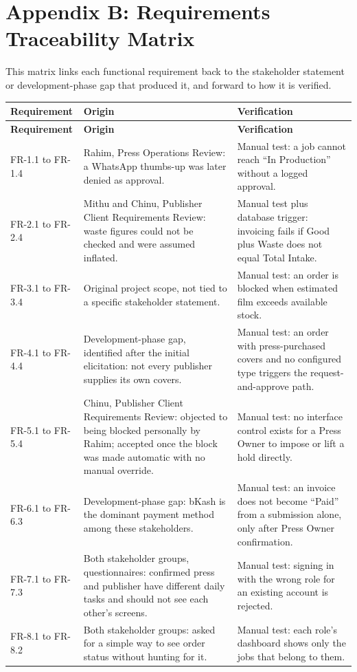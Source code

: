 \documentclass{scrreprt}
\begin{document}
\chapter*{Appendix B: Requirements Traceability Matrix}
This matrix links each functional requirement back to the stakeholder statement or development-phase gap that produced it, and forward to how it is verified.
\begin{longtable}{L{0.20\textwidth} L{0.45\textwidth} L{0.35\textwidth}}
\toprule
{} \textbf{Requirement} & \textbf{Origin} & \textbf{Verification} \\
\midrule
\endfirsthead
\toprule
{} \textbf{Requirement} & \textbf{Origin} & \textbf{Verification} \\
\midrule
\endhead
FR-1.1 to FR-1.4 & Rahim, Press Operations Review: a WhatsApp thumbs-up was later denied as approval. & Manual test: a job cannot reach ``In Production'' without a logged approval. \\
FR-2.1 to FR-2.4 & Mithu and Chinu, Publisher Client Requirements Review: waste figures could not be checked and were assumed inflated. & Manual test plus database trigger: invoicing fails if Good plus Waste does not equal Total Intake. \\
FR-3.1 to FR-3.4 & Original project scope, not tied to a specific stakeholder statement. & Manual test: an order is blocked when estimated film exceeds available stock. \\
FR-4.1 to FR-4.4 & Development-phase gap, identified after the initial elicitation: not every publisher supplies its own covers. & Manual test: an order with press-purchased covers and no configured type triggers the request-and-approve path. \\
FR-5.1 to FR-5.4 & Chinu, Publisher Client Requirements Review: objected to being blocked personally by Rahim; accepted once the block was made automatic with no manual override. & Manual test: no interface control exists for a Press Owner to impose or lift a hold directly. \\
FR-6.1 to FR-6.3 & Development-phase gap: bKash is the dominant payment method among these stakeholders. & Manual test: an invoice does not become ``Paid'' from a submission alone, only after Press Owner confirmation. \\
FR-7.1 to FR-7.3 & Both stakeholder groups, questionnaires: confirmed press and publisher have different daily tasks and should not see each other's screens. & Manual test: signing in with the wrong role for an existing account is rejected. \\
FR-8.1 to FR-8.2 & Both stakeholder groups: asked for a simple way to see order status without hunting for it. & Manual test: each role's dashboard shows only the jobs that belong to them. \\
\bottomrule
\end{longtable}
\end{document}
